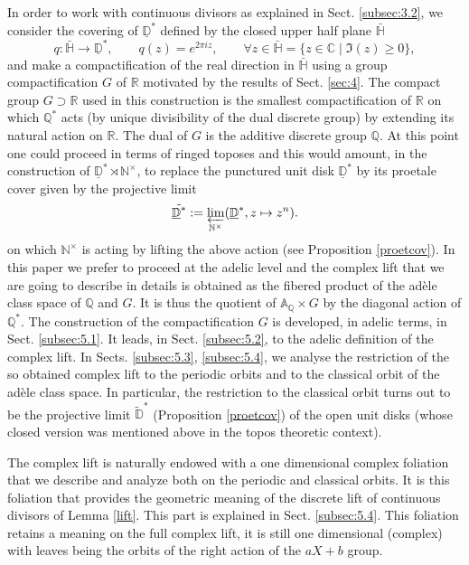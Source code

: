 \documentclass[graybox, envcountsect%
]{svmult}
\def\A{{\mathbb A}}
\def\C{{\mathbb C}}
\def\D{{\mathbb D}}
\def\N{{\mathbb N}}
\def\Q{{\mathbb Q}}
\def\R{{\mathbb R}}
\def\H{{\mathbb H}}
\def\dst{{\underline \D^*}}
\def\no{\noindent}
\def\nt{\N^{\times}}
\begin{document}
\no In order to work with continuous divisors as explained in Sect. \ref{subsec:3.2}, we consider the covering of  $\dst$ defined by the closed upper half plane $\bar\H$ 
$$
q:\bar\H\to  \dst, \qquad q(z)=e^{2\pi i z},\qquad \forall z\in \bar\H=\{z\in \C\mid \Im(z)\geq 0\},
$$ 
and make a compactification of the real direction in $\bar\H$ using a group compactification $G$ of $\R$ motivated by the results of Sect. \ref{sec:4}. 
   The compact group $G\supset \R$ used in this construction is the smallest compactification of $\R$ on which $\Q^*$ acts (by unique divisibility of the dual discrete group) by extending its natural action on $\R$. The dual of  $G$ is the additive discrete group $\Q$. \newline
   At this point one could proceed in terms of ringed toposes and this would amount, in the construction of $\dst\rtimes \nt$, to replace the punctured unit disk $\dst$ by its proetale cover given by the projective limit 
    $$
\tilde \dst:= \varprojlim_{\nt}( \dst,z\mapsto z^n).
 $$
 on which $\nt$ is acting by lifting the above action (see Proposition \ref{proetcov}). \newline
 In this paper we prefer to proceed at the adelic level and 
 the complex lift that we are going to describe in details is  obtained as the fibered product of the ad\`ele class space of $\Q$ and  $G$. It is thus  the quotient of  $\A_\Q\times G$ by the diagonal action of $\Q^*$. \newline
    The construction of the compactification $G$ is developed, in adelic terms, in Sect. \ref{subsec:5.1}. It leads, in Sect. \ref{subsec:5.2}, to the adelic definition of the complex lift. In Sects. \ref{subsec:5.3}, \ref{subsec:5.4}, we analyse the restriction of the so obtained  complex lift to the periodic orbits and to the classical orbit of the ad\`ele class space. In particular, the restriction to the classical orbit turns out to be the projective limit $\tilde \D^*$ (Proposition \ref{proetcov}) of the open unit disks (whose closed version was mentioned above in the topos theoretic context).

 The complex lift is naturally  endowed with a one dimensional complex foliation that we describe and  analyze both on the periodic and classical orbits. It is this foliation that provides the geometric meaning of the discrete lift of continuous divisors of Lemma \ref{lift}. This part is explained in Sect. \ref{subsec:5.4}. This foliation retains a meaning on the full complex lift, it is still one dimensional (complex) with leaves being the orbits of the right action of the $aX+b$ group.
\end{document}
